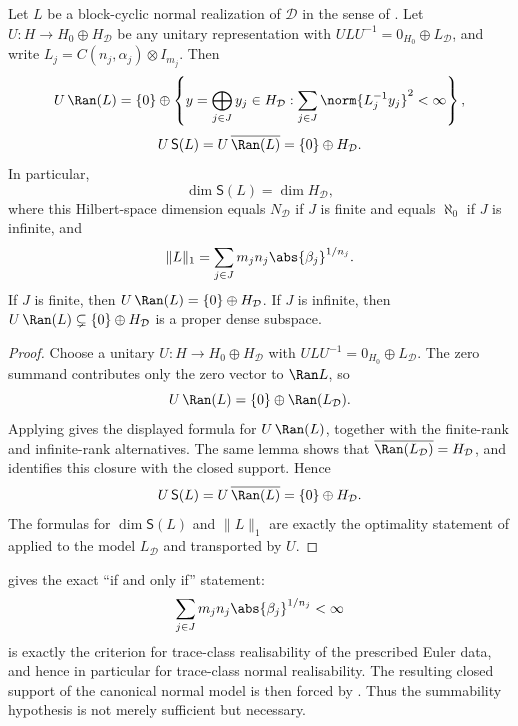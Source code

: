 \begin{corollary}
  \label{cor:block-cyclic-rigidity}
  Let \(L\) be a block-cyclic normal realization of \(\mathcal D\) in the
  sense of . Let
  \(U:H\to H_0\oplus H_{\mathcal D}\) be any unitary representation with
  \(ULU^{-1}=0_{H_0}\oplus L_{\mathcal D}\), and write
  \(L_j=C(n_j,\alpha_j)\otimes I_{m_j}\). Then
  \[
    U\,\Ran(L)
    =
    \{0\}\oplus
    \left\{
      y=\bigoplus_{j\in J}y_j\in H_{\mathcal D}:
      \sum_{j\in J}\norm{L_j^{-1}y_j}^{2}<\infty
    \right\},
  \]
  \[
    U\,\mathsf S(L)
    =U\,\overline{\Ran(L)}
    =\{0\}\oplus H_{\mathcal D}.
  \]
  In particular,
  \[
    \dim\mathsf S(L)=\dim H_{\mathcal D},
  \]
  where this Hilbert-space dimension equals \(N_{\mathcal D}\) if
  \(J\) is finite and equals \(\aleph_0\) if \(J\) is infinite, and
  \[
    \|L\|_1
    =\sum_{j\in J}m_j n_j\abs{\beta_j}^{1/n_j}.
  \]
  If \(J\) is finite, then \(U\,\Ran(L)=\{0\}\oplus H_{\mathcal D}\).
  If \(J\) is infinite, then
  \(U\,\Ran(L)\subsetneq \{0\}\oplus H_{\mathcal D}\) is a proper
  dense subspace.
\end{corollary}

\begin{proof}
  Choose a unitary \(U:H\to H_0\oplus H_{\mathcal D}\) with
  \(ULU^{-1}=0_{H_0}\oplus L_{\mathcal D}\). The zero summand contributes
  only the zero vector to \(\Ran L\), so
  \[
    U\,\Ran(L)
    =\{0\}\oplus\Ran(L_{\mathcal D}).
  \]
  Applying  gives the displayed formula
  for \(U\,\Ran(L)\), together with the finite-rank and infinite-rank
  alternatives. The same lemma shows that
  \(\overline{\Ran(L_{\mathcal D})}=H_{\mathcal D}\), and
   identifies this closure with the
  closed support. Hence
  \[
    U\,\mathsf S(L)=U\,\overline{\Ran(L)}=\{0\}\oplus H_{\mathcal D}.
  \]
  The formulas for \(\dim \mathsf S(L)\) and \(\|L\|_1\) are exactly the
  optimality statement of
   applied to the model
  \(L_{\mathcal D}\) and transported by \(U\).
\end{proof}

\begin{remark}
  \label{rem:summability-sharpness}
   gives the exact ``if and only if''
  statement:
  \[
    \sum_{j\in J}m_j n_j\abs{\beta_j}^{1/n_j}<\infty
  \]
  is exactly the criterion for trace-class realisability of the
  prescribed Euler data, and hence in particular for trace-class normal
  realisability. The resulting closed support of the canonical normal
  model is then forced by . Thus the
  summability hypothesis is not merely sufficient but necessary.
\end{remark}


